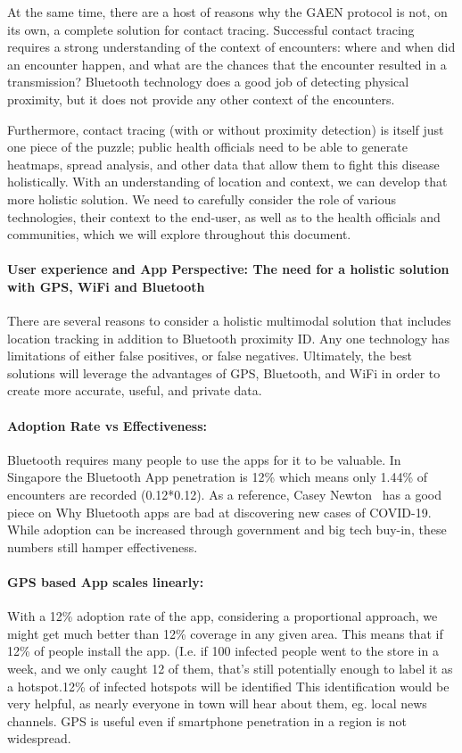 \documentclass[11pt]{article}
\begin{document}
At the same time, there are a host of reasons why the GAEN protocol is not, on its own, a complete solution for contact tracing. Successful contact tracing requires a strong understanding of the context of encounters: where and when did an encounter happen, and what are the chances that the encounter resulted in a transmission? Bluetooth technology does a good job of detecting physical proximity, but it does not provide any other context of the encounters. 

Furthermore, contact tracing (with or without proximity detection) is itself just one piece of the puzzle; public health officials need to be able to generate heatmaps, spread analysis, and other data that allow them to fight this disease holistically. With an understanding of location and context, we can develop that more holistic solution. We need to carefully consider the role of various technologies, their context to the end-user, as well as to the health officials and communities, which we will explore throughout this document.




\paragraph{User experience and App Perspective: The need for a holistic solution with GPS, WiFi and Bluetooth}
There are several reasons to consider a holistic multimodal solution that includes location tracking in addition to  Bluetooth proximity ID. Any one technology has limitations of either false positives, or false negatives. Ultimately, the best solutions will leverage the advantages of GPS, Bluetooth, and WiFi in order to create more accurate, useful, and private data.

\paragraph{Adoption Rate vs Effectiveness:} Bluetooth requires many people to use the apps for it to be valuable. In Singapore the Bluetooth App penetration is 12\% which means only 1.44\% of encounters are recorded (0.12*0.12). As a reference, Casey Newton~\cite{caseynewton} has a good piece on Why Bluetooth apps are bad at discovering new cases of COVID-19. While adoption can be increased through government and big tech buy-in, these numbers still hamper effectiveness.

\paragraph{GPS based App scales linearly:} With a 12\% adoption rate of the app, considering a proportional approach, we might get much better than 12\% coverage in any given area. This means that if 12\% of people install the app. (I.e. if 100 infected people went to the store in a week, and we only caught 12 of them, that's still potentially enough to label it as a hotspot.12\% of infected hotspots will be identified This identification would be very helpful, as nearly everyone in town will hear about them, eg. local news channels. GPS  is useful even if smartphone penetration in a region is not widespread.
\end{document}

